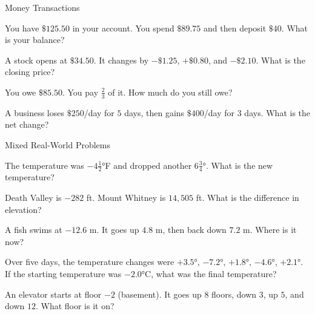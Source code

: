 \begin{practiceBox}[funOrange]{Money Transactions}

\prob You have $\$125.50$ in your account. You spend $\$89.75$ and then deposit $\$40$. What is your balance? \answerBlank[3cm]

\prob A stock opens at $\$34.50$. It changes by $-\$1.25$, $+\$0.80$, and $-\$2.10$. What is the closing price? \answerBlank[3cm]

\prob You owe $\$85.50$. You pay $\frac{2}{3}$ of it. How much do you still owe? \answerBlank[3cm]

\prob A business loses $\$250$/day for $5$ days, then gains $\$400$/day for $3$ days. What is the net change? \answerBlank[3cm]
\end{practiceBox}

\begin{practiceBox}[funPurple]{Mixed Real-World Problems}

\prob The temperature was $-4\frac{1}{2}°$F and dropped another $6\frac{3}{4}°$. What is the new temperature? \answerBlank[3cm]

\prob Death Valley is $-282$ ft. Mount Whitney is $14{,}505$ ft. What is the difference in elevation? \answerBlank[3cm]

\prob A fish swims at $-12.6$ m. It goes up $4.8$ m, then back down $7.2$ m. Where is it now? \answerBlank[3cm]
\end{practiceBox}

\begin{challengeBox}
\prob Over five days, the temperature changes were $+3.5°$, $-7.2°$, $+1.8°$, $-4.6°$, $+2.1°$. If the starting temperature was $-2.0°$C, what was the final temperature? \answerBlank[3cm]

\prob An elevator starts at floor $-2$ (basement). It goes up $8$ floors, down $3$, up $5$, and down $12$. What floor is it on? \answerBlank[3cm]
\end{challengeBox}

